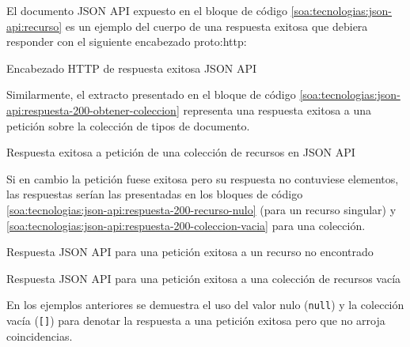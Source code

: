 El documento JSON API expuesto en el bloque de código \autoref{soa:tecnologias:json-api:recurso} es un ejemplo del cuerpo de una respuesta exitosa que debiera responder con el siguiente encabezado \gls{proto:http}:

\begin{listing}[H]
  \caption{Encabezado HTTP de respuesta exitosa JSON API}
  \label{soa:tecnologias:json-api:respuesta-200-ok}
\end{listing}

Similarmente, el extracto presentado en el bloque de código \autoref{soa:tecnologias:json-api:respuesta-200-obtener-coleccion} representa una respuesta exitosa a una petición sobre la colección de tipos de documento.

\begin{listing}
  \caption{Respuesta exitosa a petición de una colección de recursos en JSON API}
  \label{soa:tecnologias:json-api:respuesta-200-obtener-coleccion}
\end{listing}

Si en cambio la petición fuese exitosa pero su respuesta no contuviese elementos, las respuestas serían las presentadas en los bloques de código \autoref{soa:tecnologias:json-api:respuesta-200-recurso-nulo} (para un recurso singular) y \autoref{soa:tecnologias:json-api:respuesta-200-coleccion-vacia} para una colección.

\begin{listing}
  \caption{Respuesta JSON API para una petición exitosa a un recurso no encontrado}
  \label{soa:tecnologias:json-api:respuesta-200-recurso-nulo}
\end{listing}

\begin{listing}
  \caption{Respuesta JSON API para una petición exitosa a una colección de recursos vacía}
  \label{soa:tecnologias:json-api:respuesta-200-coleccion-vacia}
\end{listing}

En los ejemplos anteriores se demuestra el uso del valor nulo (\texttt{null}) y la colección vacía (\texttt{[]}) para denotar la respuesta a una petición exitosa pero que no arroja coincidencias.

